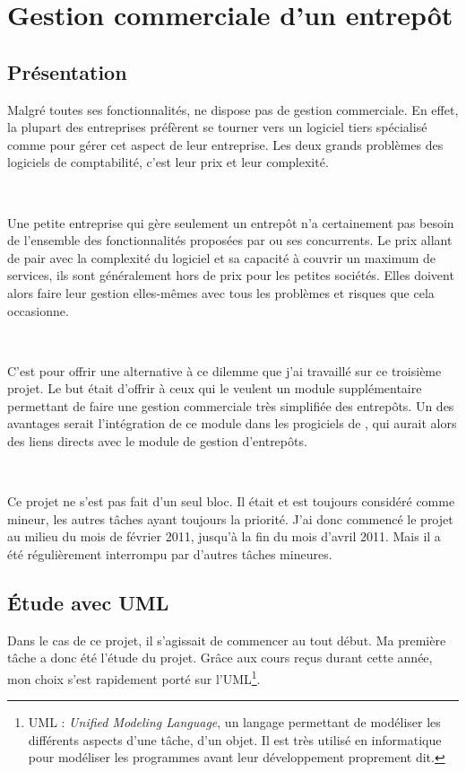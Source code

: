 \chapter{Gestion commerciale d'un entrepôt}
\label{gestion_commerciale}

\section{Présentation}
Malgré toutes ses fonctionnalités, \integrale{} ne dispose pas de gestion commerciale. En effet, la plupart des entreprises préfèrent se tourner vers un logiciel  tiers spécialisé comme  pour gérer cet aspect de leur entreprise. Les deux grands problèmes des logiciels de comptabilité, c'est leur prix et leur complexité.

~

Une petite entreprise qui gère seulement un entrepôt n'a certainement pas besoin de l'ensemble des fonctionnalités proposées par  ou ses concurrents. Le prix allant de pair avec la complexité du logiciel et sa capacité à couvrir un maximum de services, ils sont généralement hors de prix pour les petites sociétés. Elles doivent alors faire leur gestion elles-mêmes avec tous les problèmes et risques que cela occasionne.

~

C'est pour offrir une alternative à ce dilemme que j'ai travaillé sur ce troisième projet. Le but était d'offrir à ceux qui le veulent un module supplémentaire permettant de faire une gestion commerciale très simplifiée des entrepôts. Un des avantages serait l'intégration de ce module dans les progiciels de \solulog, qui aurait alors des liens directs avec le module de gestion d'entrepôts.

~

Ce projet ne s'est pas fait d'un seul bloc. Il était et est toujours considéré comme mineur, les autres tâches ayant toujours la priorité. J'ai donc commencé le projet au milieu du mois de février 2011, jusqu'à la fin du mois d'avril 2011. Mais il a été régulièrement interrompu par d'autres tâches mineures.

\section{Étude avec UML}
Dans le cas de ce projet, il s'agissait de commencer au tout début. Ma première tâche a donc été l'étude du projet. Grâce aux cours reçus durant cette année, mon choix s'est rapidement porté sur l'UML\footnote{UML : \emph{Unified Modeling Language}, un \og langage \fg{} permettant de modéliser les différents aspects d'une tâche, d'un objet. Il est très utilisé en informatique pour modéliser les programmes avant leur développement proprement dit.}.

